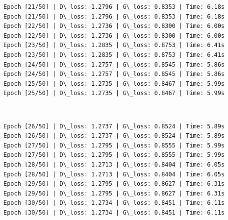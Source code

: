 \documentclass[11pt]{article}
\begin{document}
    \begin{Verbatim}[commandchars=\\\{\}]
Epoch [21/50] | D\_loss: 1.2796 | G\_loss: 0.8353 | Time: 6.18s
Epoch [21/50] | D\_loss: 1.2796 | G\_loss: 0.8353 | Time: 6.18s
Epoch [22/50] | D\_loss: 1.2736 | G\_loss: 0.8300 | Time: 6.00s
Epoch [22/50] | D\_loss: 1.2736 | G\_loss: 0.8300 | Time: 6.00s
Epoch [23/50] | D\_loss: 1.2835 | G\_loss: 0.8753 | Time: 6.41s
Epoch [23/50] | D\_loss: 1.2835 | G\_loss: 0.8753 | Time: 6.41s
Epoch [24/50] | D\_loss: 1.2757 | G\_loss: 0.8545 | Time: 5.86s
Epoch [24/50] | D\_loss: 1.2757 | G\_loss: 0.8545 | Time: 5.86s
Epoch [25/50] | D\_loss: 1.2735 | G\_loss: 0.8467 | Time: 5.99s
Epoch [25/50] | D\_loss: 1.2735 | G\_loss: 0.8467 | Time: 5.99s
    \end{Verbatim}

    \begin{center}
    \end{center}
    { \hspace*{\fill} \\}
    
    \begin{Verbatim}[commandchars=\\\{\}]
Epoch [26/50] | D\_loss: 1.2737 | G\_loss: 0.8524 | Time: 5.89s
Epoch [26/50] | D\_loss: 1.2737 | G\_loss: 0.8524 | Time: 5.89s
Epoch [27/50] | D\_loss: 1.2795 | G\_loss: 0.8555 | Time: 5.99s
Epoch [27/50] | D\_loss: 1.2795 | G\_loss: 0.8555 | Time: 5.99s
Epoch [28/50] | D\_loss: 1.2713 | G\_loss: 0.8404 | Time: 6.05s
Epoch [28/50] | D\_loss: 1.2713 | G\_loss: 0.8404 | Time: 6.05s
Epoch [29/50] | D\_loss: 1.2795 | G\_loss: 0.8627 | Time: 6.31s
Epoch [29/50] | D\_loss: 1.2795 | G\_loss: 0.8627 | Time: 6.31s
Epoch [30/50] | D\_loss: 1.2734 | G\_loss: 0.8451 | Time: 6.11s
Epoch [30/50] | D\_loss: 1.2734 | G\_loss: 0.8451 | Time: 6.11s
    \end{Verbatim}

    \begin{center}
    \end{center}
    { \hspace*{\fill} \\}
    
\end{document}

